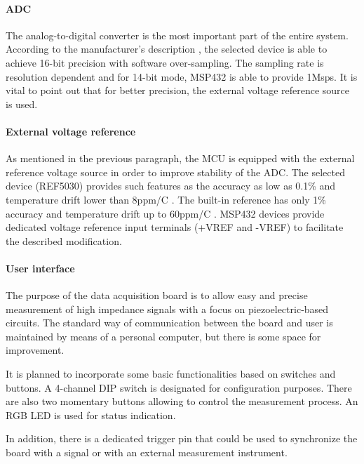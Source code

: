 \documentclass[12pt,a4paper]{article}
\begin{document}
\par

\paragraph{ADC}
The analog-to-digital converter is the most important part of the entire system. According to the manufacturer's description \cite{msp432_params}, the selected device is able to achieve 16-bit precision with software over-sampling. The sampling rate is resolution dependent and for 14-bit mode, MSP432 is able to provide 1Msps. It is vital to point out that for better precision, the external voltage reference source is used. 
\par

\paragraph{External voltage reference}
As mentioned in the previous paragraph, the MCU is equipped with the external reference voltage source in order to improve stability of the ADC. The selected device (REF5030)  provides such features as the accuracy as low as 0.1\% and temperature drift lower than 8ppm/\degree C \cite{ref5030_params}. The built-in reference has only 1\% accuracy and temperature drift up to 60ppm/\degree C \cite{msp432_params}. MSP432 devices provide dedicated voltage reference input terminals (+VREF and -VREF) to facilitate the described modification.
\par

\paragraph{User interface} 
The purpose of the data acquisition board is to allow easy and precise measurement of high impedance signals with a focus on piezoelectric-based circuits. The standard way of communication between the board and user is maintained by means of a personal computer, but there is some space for improvement.
\par
It is planned to incorporate some basic functionalities based on switches and buttons. A 4-channel DIP switch is designated for configuration purposes. There are also two momentary buttons allowing to control the measurement process. An RGB LED is used for status indication.
\par
In addition, there is a dedicated trigger pin that could be used to synchronize the board with a signal or with an external measurement instrument.
\par
\end{document}
